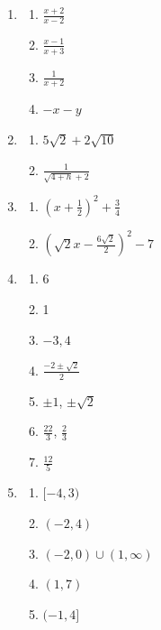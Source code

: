 \documentclass{article}
\begin{document}
\begin{enumerate}
\begin{enumerate}[label=(\alph*)]
              \item $\frac{3}{\sqrt{x}}(x^2-9x+6)$
              \item $xy(x+2)(x-2)$
          \end{enumerate}
    \item \begin{enumerate}[label=(\alph*)]
              \item $\frac{x+2}{x-2}$
              \item $\frac{x-1}{x+3}$
              \item $\frac{1}{x+2}$
              \item $-x-y$
          \end{enumerate}
    \item \begin{enumerate}[label=(\alph*)]
              \item $5\sqrt{2}+2\sqrt{10}$
              \item $\frac{1}{\sqrt{4+h}+2}$
          \end{enumerate}
    \item \begin{enumerate}[label=(\alph*)]
              \item $(x+\frac{1}{2})^2+\frac{3}{4}$
              \item $(\sqrt{2}x-\frac{6\sqrt{2}}{2})^2-7$
          \end{enumerate}
    \item \begin{enumerate}[label=(\alph*)]
              \item 6
              \item 1
              \item $-3, 4$
              \item $\frac{-2\pm\sqrt{2}}{2}$
              \item $\pm1$, $\pm\sqrt{2}$
              \item $\frac{22}{3}$, $\frac{2}{3}$
              \item $\frac{12}{5}$
          \end{enumerate}
    \item \begin{enumerate}[label=(\alph*)]
              \item $[-4, 3)$
              \item $(-2, 4)$
              \item $(-2, 0) \cup (1, \infty)$
              \item $(1, 7)$
              \item $(-1, 4]$

\end{enumerate}
\end{enumerate}
\end{document}
